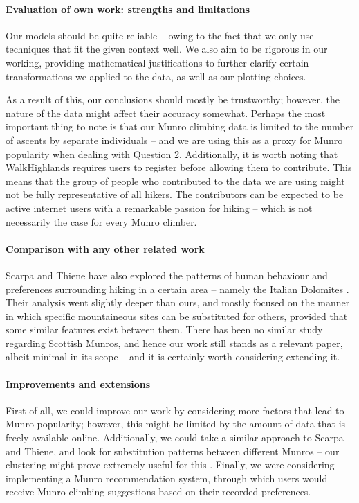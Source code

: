 \documentclass[11pt,a4paper]{article}
\begin{document}
\paragraph{Evaluation of own work: strengths and limitations}
Our models should be quite reliable – owing to the fact that we only use techniques that fit the given context well. We also aim to be rigorous in our working, providing mathematical justifications to further clarify certain transformations we applied to the data, as well as our plotting choices.

As a result of this, our conclusions should mostly be trustworthy; however, the nature of the data might affect their accuracy somewhat. Perhaps the most important thing to note is that our Munro climbing data is limited to the number of ascents by separate individuals – and we are using this as a proxy for Munro popularity when dealing with Question 2. Additionally, it is worth noting that WalkHighlands requires users to register before allowing them to contribute. This means that the group of people who contributed to the data we are using might not be fully representative of all hikers. The contributors can be expected to be active internet users with a remarkable passion for hiking – which is not necessarily the case for every Munro climber.
\paragraph{Comparison with any other related work}
Scarpa and Thiene have also explored the patterns of human behaviour and preferences surrounding hiking in a certain area – namely the Italian Dolomites \cite{HitA}. Their analysis went slightly deeper than ours, and mostly focused on the manner in which specific mountaineous sites can be substituted for others, provided that some similar features exist between them. There has been no similar study regarding Scottish Munros, and hence our work still stands as a relevant paper, albeit minimal in its scope – and it is certainly worth considering extending it.
\paragraph{Improvements and extensions}
First of all, we could improve our work by considering more factors that lead to Munro popularity; however, this might be limited by the amount of data that is freely available online. Additionally, we could take a similar approach to Scarpa and Thiene, and look for substitution patterns between different Munros – our clustering might prove extremely useful for this \cite{HitA}. Finally, we were considering implementing a Munro recommendation system, through which users would receive Munro climbing suggestions based on their recorded preferences.


\end{document}
